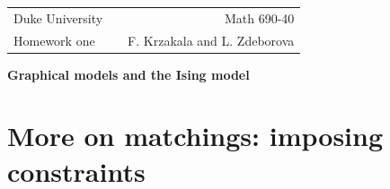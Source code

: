 \documentclass[a4paper,oneside,12pt]{article}
\begin{document}
\noindent

\begin{tabular}{lcr}
  Duke University & & Math 690-40 \\  
  Homework one & \hspace{6.3cm} & F. Krzakala and L. Zdeborova\\ \hline
\end{tabular}

\begin{center}
  {\Large {\bf Graphical models and the Ising model}}
\end{center}

\section*{More on matchings:  imposing constraints}
\end{document}
